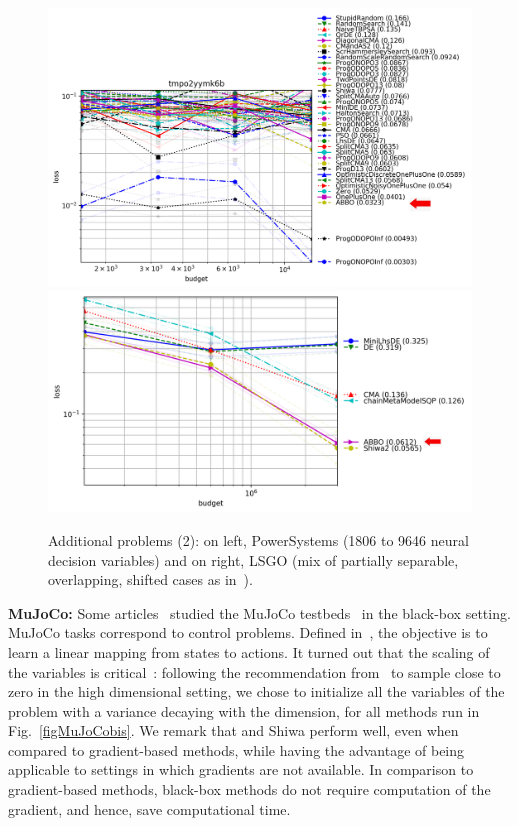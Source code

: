 \begin{figure}[t]
    \centering
\includegraphics[trim={0 0 0 125},clip,width=.48\linewidth]{sections/appendix/h220benchmarks/benchmark/xp_powersystems.png}
\vspace{0.5cm}
\includegraphics[trim={0 0 0 10},clip,width=0.48\linewidth]{sections/appendix/h220benchmarks/benchmark/xp_lsgo.png}
\caption{{Additional problems (2): on left, PowerSystems (1806 to 9646 neural decision variables) and  on right, LSGO (mix of partially separable, overlapping, shifted cases as in~\cite{lsgo}).}} 
	\label{figaddrwbisbis}

\end{figure}

{\textbf{MuJoCo:}}\label{MuJoCo}\label{b7}
Some articles~\cite{lmrs,lamcts} studied the MuJoCo testbeds~\cite{mujoco} in the black-box setting. MuJoCo tasks correspond to control problems. Defined in~\cite{lamcts,ars}, the objective is to learn a linear mapping from states to actions. {
It turned out that the scaling of the variables is critical~\cite{ars}: following the recommendation from~\cite{ppsnrescaling} to sample close to zero in the high dimensional setting, we chose to initialize all the variables of the problem with a variance decaying with the dimension, for all methods run in Fig.~\ref{figMuJoCobis}. We remark that \ngoptq{} and Shiwa perform well, even when compared to gradient-based methods, while having the advantage of being applicable to settings in which gradients are not available. In comparison to gradient-based methods, black-box methods do not require computation of the gradient, and hence, save computational time.}

